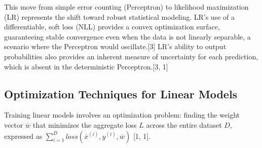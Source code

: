 \documentclass{article}
\begin{document}
This move from simple error counting (Perceptron) to likelihood maximization (LR) represents the shift toward robust statistical modeling. LR's use of a differentiable, soft loss (NLL) provides a convex optimization surface, guaranteeing stable convergence even when the data is not linearly separable, a scenario where the Perceptron would oscillate.[3] LR’s ability to output probabilities also provides an inherent measure of uncertainty for each prediction, which is absent in the deterministic Perceptron.[3, 1]

\begin{table}[h!]
\centering
\caption{Comparison of Linear Binary Classifiers}
\end{table}

\subsection{Optimization Techniques for Linear Models}

Training linear models involves an optimization problem: finding the weight vector $\overline{w}$ that minimizes the aggregate loss $L$ across the entire dataset $D$, expressed as $\sum_{i=1}^{D}loss(\overline{x}^{(i)},y^{(i)},\overline{w})$ [1, 1].
\end{document}
